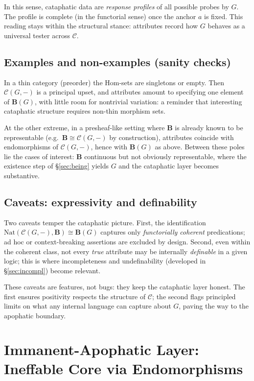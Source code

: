 \documentclass[11pt]{article}
\theoremstyle{upright}
\begin{document}
In this sense, cataphatic data are \emph{response profiles} of all possible probes by \(G\). The profile is complete (in the functorial sense) once the anchor \(a\) is fixed. This reading stays within the structural stance: attributes record how \(G\) behaves as a universal tester across \(\mathcal C\).

\subsection{Examples and non-examples (sanity checks)}
In a thin category (preorder) the Hom-sets are singletons or empty. Then \(\mathcal C(G,-)\) is a principal upset, and attributes amount to specifying one element of \(\mathbf B(G)\), with little room for nontrivial variation: a reminder that interesting cataphatic structure requires non-thin morphism sets.

At the other extreme, in a presheaf-like setting where \(\mathbf B\) is already known to be representable (e.g.\ \(\mathbf B\cong \mathcal C(G,-)\) by construction), attributes coincide with endomorphisms of \(\mathcal C(G,-)\), hence with \(\mathbf B(G)\) as above. Between these poles lie the cases of interest: \(\mathbf B\) continuous but not obviously representable, where the existence step of \S\ref{sec:being} yields \(G\) and the cataphatic layer becomes substantive.

\subsection{Caveats: expressivity and definability}
Two caveats temper the cataphatic picture. First, the identification \(\mathrm{Nat}(\mathcal C(G,-),\mathbf B)\!\cong\!\mathbf B(G)\) captures only \emph{functorially coherent} predications; ad hoc or context-breaking assertions are excluded by design. Second, even within the coherent class, not every \emph{true} attribute may be internally \emph{definable} in a given logic; this is where incompleteness and undefinability (developed in \S\ref{sec:incompl}) become relevant.

These caveats are features, not bugs: they keep the cataphatic layer honest. The first ensures positivity respects the structure of \(\mathcal C\); the second flags principled limits on what any internal language can capture about \(G\), paving the way to the apophatic boundary. \citep{PseudoDionysius1987}

\section{Immanent-Apophatic Layer: Ineffable Core via Endomorphisms}\label{sec:apophatic}
\end{document}
